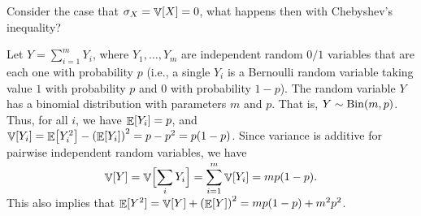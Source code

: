 \begin{exercise}
    Consider the case that $\sigma_X = \mathop{\mathbb{V}}\!\left[ {X} \right] = 0$, what happens then
    with Chebyshev's inequality?
\end{exercise}

\begin{example}
    Let $Y = \sum_{i=1}^m Y_i$, where $Y_1, \ldots, Y_m$ are independent random
    $0/1$ variables that are each one with probability $p$ (i.e., a
    single $Y_i$ is a Bernoulli random variable taking value $1$ with
    probability $p$ and $0$ with probability $1-p$). The random variable
    $Y$ has a binomial distribution with parameters $m$ and $p$.  That
    is, $Y \sim \DistBinom{m}{p}$. Thus, for all $i$, we have
    $\mathop{\mathbb{E}}\!\left[ {Y_i} \right] = p$, and
    $\Var{Y_i} = \Ex{Y_i^2} - \pth{\Ex{Y_i}}^2 = p - p^2 = p(1-p)$. Since
    variance is additive for pairwise independent random variables, we
    have
    \begin{equation}
        \Var{Y} = \Var{\Bigl. \smash{\sum_i Y_i}} =
        \smash{\sum_{i=1}^m \Var{Y_i}} = m p (1-p).
        \eqlab{var-bionomial}
    \end{equation}
    This also implies that
    $\Ex{\smash{Y^2}} = \Var{Y} + \pth{\Ex{Y}}^2 = m p (1-p) + m^2 p^2$.
\end{example}










